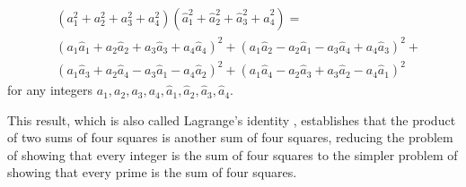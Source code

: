 \documentclass[12pt]{article}
\begin{document}
\begin{theorem}
\label{thm:euler}
\[
\begin{array}{ll}
& (a_1^2 + a_2^2 + a_3^2 + a_4^2) 
(\hat{a}^2_1 + \hat{a}^2_2 + \hat{a}^2_3 + \hat{a}^2_4) = \\
& (a_1 \hat{a}_1 + a_2\hat{a}_2 + a_3\hat{a}_3 + a_4\hat{a}_4)^2 +
  (a_1 \hat{a}_2 - a_2\hat{a}_1 - a_3\hat{a}_4 + a_4\hat{a}_3)^2 + \\
& (a_1\hat{a}_3 + a_2\hat{a}_4 - a_3\hat{a}_1 - a_4\hat{a}_2)^2 +
  (a_1\hat{a}_4 - a_2\hat{a}_3 + a_3\hat{a}_2 - a_4\hat{a}_1)^2
\end{array}
\]
for any integers $a_1,a_2,a_3,a_4,\hat{a}_1,\hat{a}_2,\hat{a}_3,\hat{a}_4$.
\end{theorem}
%
%
This result, which is also called Lagrange's identity \cite{herstein75}, %
establishes that the product of two sums of four squares is another sum of four squares,
reducing the problem of showing that every integer is the sum of four squares to 
the simpler problem of showing that every prime is the sum of four squares.
\end{document}
